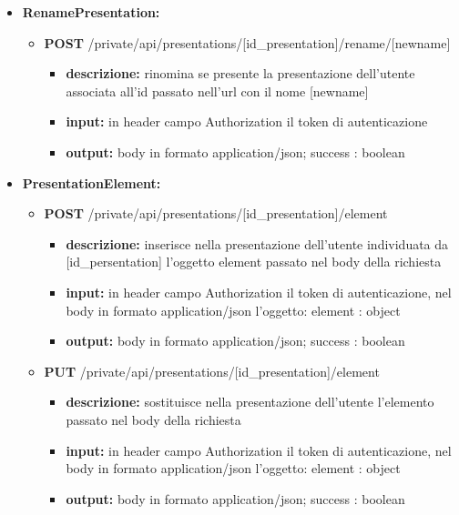 {{\begin{itemize}
		\item \textbf{RenamePresentation:}
			\begin{itemize}
			\item  \textbf{POST} /private/api/presentations/[id\_presentation]/rename/[newname] 
				\begin{itemize} 
				\item \textbf{descrizione:} rinomina se presente la presentazione dell'utente associata all'id passato nell'url con il nome [newname]
				\item \textbf{input:} in header campo Authorization il token di autenticazione
				\item \textbf{output:} body in formato application/json; success : boolean
				\end{itemize}
			\end{itemize}
			
		\item \textbf{PresentationElement:}
			\begin{itemize}
			\item   \textbf{POST} /private/api/presentations/[id\_presentation]/element
				\begin{itemize} 
				\item \textbf{descrizione:} inserisce nella presentazione dell'utente individuata da [id\_persentation] l'oggetto element passato nel body della richiesta
				\item \textbf{input:} in header campo Authorization il token di autenticazione, nel body in formato application/json l'oggetto: element : object
				\item \textbf{output:} body in formato application/json; success : boolean
				\end{itemize}
				
			\item  \textbf{PUT} /private/api/presentations/[id\_presentation]/element
				\begin{itemize} 
				\item \textbf{descrizione:} sostituisce nella presentazione dell'utente l'elemento passato nel body della richiesta
				\item \textbf{input:} in header campo Authorization il token di autenticazione, nel body in formato application/json l'oggetto: element : object
				\item \textbf{output:} body in formato application/json; success : boolean
				\end{itemize}
			\end{itemize}
				

\end{itemize}}}
